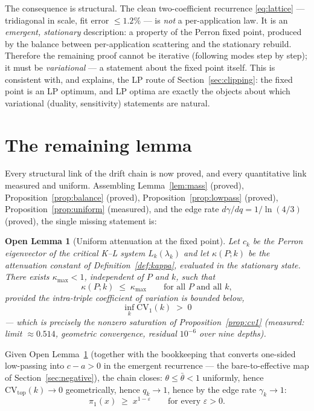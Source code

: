 \documentclass[11pt]{article}
\newtheorem{openlemma}[theorem]{Open Lemma}
\theoremstyle{definition}
\theoremstyle{remark}
\newcommand{\CV}{\mathrm{CV}}
\newcommand{\lam}{\lambda}
\newcommand{\gam}{\gamma}
\newcommand{\kap}{\kappa}
\begin{document}
The consequence is structural. The clean two-coefficient recurrence
\eqref{eq:lattice} --- tridiagonal in scale, fit error $\leq 1.2\%$ ---
is \emph{not} a per-application law. It is an \emph{emergent, stationary}
description: a property of the Perron fixed point, produced by the
balance between per-application scattering and the stationary rebuild.
Therefore the remaining proof cannot be iterative (following modes step
by step); it must be \emph{variational} --- a statement about the fixed
point itself. This is consistent with, and explains, the LP route of
Section~\ref{sec:clipping}: the fixed point is an LP optimum, and LP
optima are exactly the objects about which variational (duality,
sensitivity) statements are natural.

\section{The remaining lemma}
\label{sec:open}

Every structural link of the drift chain is now proved, and every
quantitative link measured and uniform. Assembling
Lemma~\ref{lem:mass} (proved), Proposition~\ref{prop:balance} (proved),
Proposition~\ref{prop:lowpass} (proved), Proposition~\ref{prop:uniform}
(measured), and the edge rate $d\gam/dq = 1/\ln(4/3)$ (proved), the
single missing statement is:

\begin{openlemma}[Uniform attenuation at the fixed point]
\label{open:kappa}
Let $c_k$ be the Perron eigenvector of the critical K--L system
$L_k(\lam_k)$ and let $\kap(P; k)$ be the attenuation constant of
Definition~\ref{def:kappa}, evaluated in the stationary state. There
exists $\kap_{\max} < 1$, independent of $P$ and $k$, such that
\[
\kap(P; k) \;\leq\; \kap_{\max}
\qquad \text{for all } P \text{ and all } k,
\]
provided the intra-triple coefficient of variation is bounded below,
\[
\inf_k \CV_1(k) \;>\; 0
\]
--- which is precisely the nonzero saturation of
Proposition~\ref{prop:cv1} (measured: limit $\approx 0.514$, geometric
convergence, residual $10^{-6}$ over nine depths).
\end{openlemma}

Given Open Lemma~\ref{open:kappa} (together with the bookkeeping that
converts one-sided low-passing into $c - a > 0$ in the emergent recurrence
--- the bare-to-effective map of Section~\ref{sec:negative}), the chain
closes: $\theta \leq \bar\theta < 1$ uniformly, hence
$\CV_{\mathrm{top}}(k) \to 0$ geometrically, hence $q_k \to 1$, hence by
the edge rate $\gam_k \to 1$:
\[
\pi_1(x) \;\geq\; x^{1 - \varepsilon}
\qquad \text{for every } \varepsilon > 0 .
\]
\end{document}
